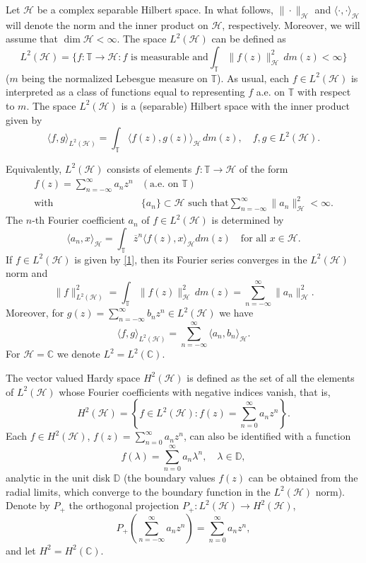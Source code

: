 \documentclass[12pt]{amsart}
\numberwithin{equation}{section}
\newcommand{\hsp}{\mathcal{H}}
\newcommand{\h}{\mathcal{H}}
\newcommand{\z}{{z}}
\theoremstyle{definition}
\numberwithin{equation}{section}
\begin{document}
Let $\hsp$ be a complex separable Hilbert space. In what follows, $\|\cdot\|_\hsp$ and $\langle\cdot,\cdot\rangle_{\hsp}$ will denote the norm and the inner product on $\hsp$, respectively. Moreover, we will assume that $\dim\hsp<\infty$. The space $L^{2}(\hsp)$ can be defined as
$$L^2(\h)=\{f\colon\mathbb{T}\to \hsp: f \text{ is measurable and} \int_{\mathbb{T}} \| f(\z)\|_\hsp^2\,dm(\z)<\infty  \}$$
($m$ being the normalized Lebesgue measure on $\mathbb{T}$). As usual, each $f\in L^2(\hsp)$ is interpreted as a class of functions equal to representing $f$ a.e. on $\mathbb{T}$ with respect to $m$. The space $L^2(\h)$ is a (separable) Hilbert space with the inner product given by
\begin{equation*}
\langle f,g\rangle_{L^{2}(\hsp)}=\int_{\mathbb{T}}\langle f(\z),g(\z)\rangle_{\hsp}\,dm(\z),\quad f,g\in L^2(\hsp).
\end{equation*}

Equivalently, $L^2(\hsp)$ consists of elements $f:\mathbb{T}\to \hsp$ of the form
\begin{equation}\label{1}
 \begin{array}{rl}
 f(\z)=\sum\limits_{n=-\infty}^{\infty}a_{n}\z^n&  (\text{a.e. on }\mathbb{T})\\
  \text{with}&\{a_{n}\}\subset\hsp\text{ such that}  \sum\limits_{n=-\infty}^{\infty}\|a_{n}\|_\hsp^{2}<\infty.\end{array}\end{equation}
 The $n$-th Fourier coefficient $a_n$  of $f\in L^2(\hsp)$ is determined by
\begin{equation}\label{fourier}
\langle a_n,x\rangle_\hsp=\int_{\mathbb{T}}\overline{\z}^n\langle f(\z),x\rangle_\hsp  dm(\z)\quad \text{for all }x\in\hsp.
\end{equation}
If $f\in L^2(\hsp)$ is given by \eqref{1}, then its Fourier series converges in the  $L^2(\h)$ norm and
$$\|f\|_{L^2(\hsp)}^2=\int_{\mathbb{T}} \| f(\z)\|_\hsp^2\,dm(\z)=\sum\limits_{n=-\infty}^{\infty}\|a_{n}\|_\hsp^{2}.$$
Moreover, for $\displaystyle g(\z)=\sum_{n=-\infty}^{\infty}b_{n}\z^n\in L^2(\hsp)$ we have
$$\langle f, g\rangle_{L^2(\hsp)}=\sum\limits_{n=-\infty}^\infty \langle a_n,b_n\rangle_{\hsp}.$$
For $\hsp=\mathbb{C}$ we denote $L^2=L^2(\mathbb{C})$.


The vector valued Hardy space $H^2(\hsp)$ is defined as the set of all the elements of $L^2(\hsp)$ whose Fourier coefficients with negative indices vanish, that is,
$$H^2(\hsp)=\left\{f\in L^2(\hsp): f(\z)=\sum_{n=0}^{\infty} a_n \z^n\right\}.$$
Each $f\in H^2(\hsp)$, $\displaystyle f(\z)=\sum_{n=0}^{\infty} a_n \z^n$, can also be identified with a function
$$f(\lambda)=\sum\limits_{n=0}^\infty a_n\lambda^n,\quad \lambda\in\mathbb{D},$$
analytic in the unit disk $\mathbb{D}$ (the boundary values $f(\z)$ can be obtained from the radial limits, which converge to the boundary function in the $L^2(\hsp)$ norm). Denote by $P_+$ the orthogonal projection $P_+:L^2(\hsp)\to H^2(\hsp)$,
 $$P_+\left(\sum_{n=-\infty}^{\infty} a_n \z^n\right)=\sum_{n=0}^{\infty} a_n \z^n,$$
 and let $H^2=H^2(\mathbb{C})$.
\end{document}
